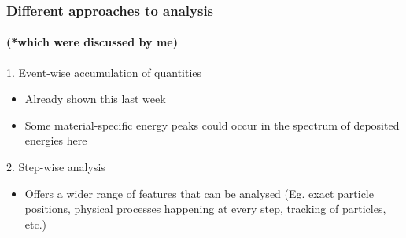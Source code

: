 \begin{frame}
\frametitle{Different approaches to analysis}
\framesubtitle{(*which were discussed by me)}

\begin{block}{1. Event-wise accumulation of quantities}
	\begin{itemize}
		\item Already shown this last week
		\item Some material-specific energy peaks could occur in the spectrum of deposited energies here
	\end{itemize}
\end{block}

\begin{block}{2. Step-wise analysis}
	\begin{itemize}
		\item Offers a wider range of features that can be analysed (Eg. exact particle positions, physical processes happening at every step, tracking of particles, etc.)
	\end{itemize}
\end{block}
\end{frame}